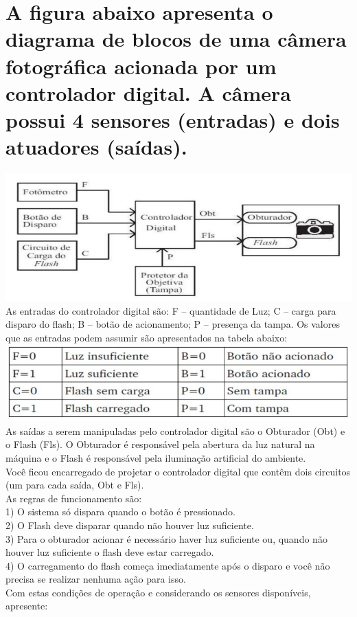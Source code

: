 \documentclass{article}
\begin{document}
		\section{A figura abaixo apresenta o diagrama de blocos de uma câmera fotográfica acionada por um controlador digital. A câmera possui 4 sensores (entradas) e dois atuadores (saídas).}
		\includegraphics[scale = 0.6]{images/CAMERA.jpg}
		\\
		As entradas do controlador digital são: F – quantidade de Luz; C – carga para disparo do
		flash; B – botão de acionamento; P – presença da tampa. Os valores que as entradas podem
		assumir são apresentados na tabela abaixo:
		\\
		\vspace*{0.5cm}
		\hspace*{1cm}
		\includegraphics[scale = 0.65]{images/TABELA COND.jpg}
		\vspace*{0.5cm}
		\\
		As saídas a serem manipuladas pelo controlador digital são o Obturador (Obt) e o Flash (Fls).
		O Obturador é responsável pela abertura da luz natural na máquina e o Flash é responsável
		pela iluminação artificial do ambiente.\\
		Você ficou encarregado de projetar o controlador digital que contêm dois circuitos (um para
		cada saída, Obt e Fls).\\
		As regras de funcionamento são:\\
		1) O sistema só dispara quando o botão é pressionado.\\
		2) O Flash deve disparar quando não houver luz suficiente.\\
		3) Para o obturador acionar é necessário haver luz suficiente ou, quando não houver luz
		suficiente o flash deve estar carregado.\\
		4) O carregamento do flash começa imediatamente após o disparo e você não precisa se
		realizar nenhuma ação para isso.\\
		Com estas condições de operação e considerando os sensores disponíveis, apresente:\\
\end{document}
